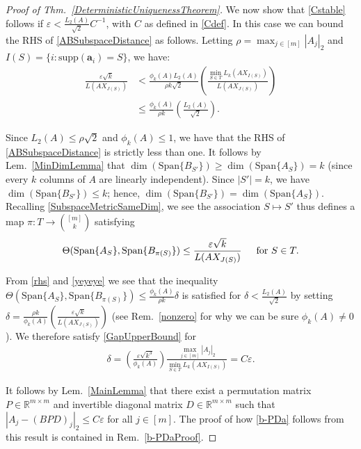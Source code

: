 \documentclass[journal, twocolumn]{IEEEtran}
\begin{document}
\begin{proof}[Proof of Thm.~\ref{DeterministicUniquenessTheorem}]
We now show that \eqref{Cstable} follows if $\varepsilon < \frac{L_2(A)}{\sqrt{2}}C^{-1}$, with $C$ as defined in \eqref{Cdef}. In this case we can bound the RHS of \eqref {ABSubspaceDistance} as follows. Letting $\rho = \max_{j \in [m]} |A_j|_2$ and $I(S) = \{i: \text{supp}(\mathbf{a}_i)=S\}$, we have:
\begin{align}\label{rhs}
\frac{\varepsilon\sqrt{k}}{L(AX_{J(S)})} 
&<  \frac{\phi_k(A) L_2(A)}{\rho k \sqrt{2}} \left( \frac{\min_{S \in T}L_k(AX_{I(S)})}{L(AX_{J(S)})} \right) \nonumber \\
&\leq \frac{\phi_k(A)}{\rho k} \left( \frac{L_2(A)}{\sqrt{2}} \right).
\end{align}

Since $L_2(A) \leq \rho \sqrt{2}$ and $\phi_k(A) \leq 1$, we have that the RHS of \eqref{ABSubspaceDistance} is strictly less than one. It follows by Lem.~\ref{MinDimLemma} that $\dim(\text{Span}\{B_{S'}\}) \geq \dim(\text{Span}\{A_{S}\}) = k$ (since every $k$ columns of $A$ are linearly independent). Since $|S'| = k$, we have $\dim(\text{Span}\{B_{S'}\}) \leq k$; hence, $\dim(\text{Span}\{B_{S'}\}) = \dim(\text{Span}\{A_{S}\})$. Recalling \eqref{SubspaceMetricSameDim},  we see the association $S \mapsto S'$ thus defines a map $\pi: T \to {[m] \choose k}$ satisfying
\begin{align}\label{yeyeye}
\Theta(\text{Span}\{A_{S}\}, \text{Span}\{B_{\pi(S)}\}) \leq \frac{\varepsilon\sqrt{k}}{L(AX_{J(S)})} \indent \text{for } S \in T.
\end{align}

From \eqref{rhs} and \eqref{yeyeye} we see that the inequality $\Theta(\text{Span}\{A_{S}\}, \text{Span}\{B_{\pi(S)}\}) \leq \frac{ \phi_k(A) }{\rho k} \delta$ is satisfied for $\delta < \frac{L_2(A)}{\sqrt{2}}$ by setting $\delta = \frac{ \rho k}{ \phi_k(A) } \left(  \frac{\varepsilon \sqrt{k}}{L(AX_{J(S)})} \right)$ (see Rem.~\ref{nonzero} for why we can be sure $\phi_k(A) \neq 0$). We therefore satisfy \eqref{GapUpperBound} for 
\begin{align}
\delta = \left( \frac{ \varepsilon \sqrt{k^3}}{ \phi_k(A) } \right) \frac{\max_{j \in [m]} |A_j|_2}{\min_{S \in T} L_k(AX_{I(S)})}
= C\varepsilon.
\end{align}

It follows by Lem.~\ref{MainLemma} that there exist a permutation matrix $P \in \mathbb{R}^{m \times m}$ and invertible diagonal matrix $D \in \mathbb{R}^{m \times m}$ such that $|A_j - (BPD)_j|_2 \leq C\varepsilon$ for all $j \in [m]$. The proof of how \eqref{b-PDa} follows from this result is contained in Rem.~\ref{b-PDaProof}.
\end{proof}
\end{document}

